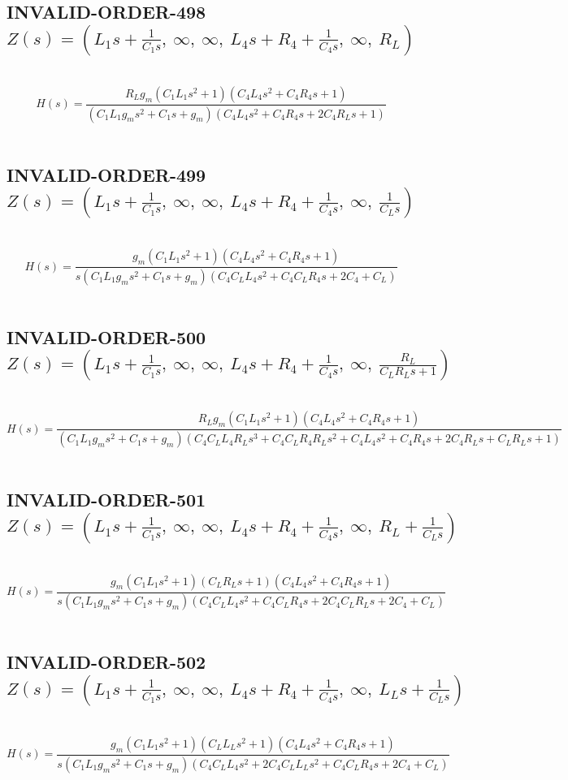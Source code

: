 \documentclass{article}
\begin{document}
\subsection{INVALID-ORDER-498 $Z(s) = \left( L_{1} s + \frac{1}{C_{1} s}, \  \infty, \  \infty, \  L_{4} s + R_{4} + \frac{1}{C_{4} s}, \  \infty, \  R_{L}\right)$ } \ 
\textbf{\[H(s) = \frac{R_{L} g_{m} \left(C_{1} L_{1} s^{2} + 1\right) \left(C_{4} L_{4} s^{2} + C_{4} R_{4} s + 1\right)}{\left(C_{1} L_{1} g_{m} s^{2} + C_{1} s + g_{m}\right) \left(C_{4} L_{4} s^{2} + C_{4} R_{4} s + 2 C_{4} R_{L} s + 1\right)}\] } \ 
\subsection{INVALID-ORDER-499 $Z(s) = \left( L_{1} s + \frac{1}{C_{1} s}, \  \infty, \  \infty, \  L_{4} s + R_{4} + \frac{1}{C_{4} s}, \  \infty, \  \frac{1}{C_{L} s}\right)$ } \ 
\textbf{\[H(s) = \frac{g_{m} \left(C_{1} L_{1} s^{2} + 1\right) \left(C_{4} L_{4} s^{2} + C_{4} R_{4} s + 1\right)}{s \left(C_{1} L_{1} g_{m} s^{2} + C_{1} s + g_{m}\right) \left(C_{4} C_{L} L_{4} s^{2} + C_{4} C_{L} R_{4} s + 2 C_{4} + C_{L}\right)}\] } \ 
\subsection{INVALID-ORDER-500 $Z(s) = \left( L_{1} s + \frac{1}{C_{1} s}, \  \infty, \  \infty, \  L_{4} s + R_{4} + \frac{1}{C_{4} s}, \  \infty, \  \frac{R_{L}}{C_{L} R_{L} s + 1}\right)$ } \ 
\textbf{\[H(s) = \frac{R_{L} g_{m} \left(C_{1} L_{1} s^{2} + 1\right) \left(C_{4} L_{4} s^{2} + C_{4} R_{4} s + 1\right)}{\left(C_{1} L_{1} g_{m} s^{2} + C_{1} s + g_{m}\right) \left(C_{4} C_{L} L_{4} R_{L} s^{3} + C_{4} C_{L} R_{4} R_{L} s^{2} + C_{4} L_{4} s^{2} + C_{4} R_{4} s + 2 C_{4} R_{L} s + C_{L} R_{L} s + 1\right)}\] } \ 
\subsection{INVALID-ORDER-501 $Z(s) = \left( L_{1} s + \frac{1}{C_{1} s}, \  \infty, \  \infty, \  L_{4} s + R_{4} + \frac{1}{C_{4} s}, \  \infty, \  R_{L} + \frac{1}{C_{L} s}\right)$ } \ 
\textbf{\[H(s) = \frac{g_{m} \left(C_{1} L_{1} s^{2} + 1\right) \left(C_{L} R_{L} s + 1\right) \left(C_{4} L_{4} s^{2} + C_{4} R_{4} s + 1\right)}{s \left(C_{1} L_{1} g_{m} s^{2} + C_{1} s + g_{m}\right) \left(C_{4} C_{L} L_{4} s^{2} + C_{4} C_{L} R_{4} s + 2 C_{4} C_{L} R_{L} s + 2 C_{4} + C_{L}\right)}\] } \ 
\subsection{INVALID-ORDER-502 $Z(s) = \left( L_{1} s + \frac{1}{C_{1} s}, \  \infty, \  \infty, \  L_{4} s + R_{4} + \frac{1}{C_{4} s}, \  \infty, \  L_{L} s + \frac{1}{C_{L} s}\right)$ } \ 
\textbf{\[H(s) = \frac{g_{m} \left(C_{1} L_{1} s^{2} + 1\right) \left(C_{L} L_{L} s^{2} + 1\right) \left(C_{4} L_{4} s^{2} + C_{4} R_{4} s + 1\right)}{s \left(C_{1} L_{1} g_{m} s^{2} + C_{1} s + g_{m}\right) \left(C_{4} C_{L} L_{4} s^{2} + 2 C_{4} C_{L} L_{L} s^{2} + C_{4} C_{L} R_{4} s + 2 C_{4} + C_{L}\right)}\] } \ 
\end{document}
